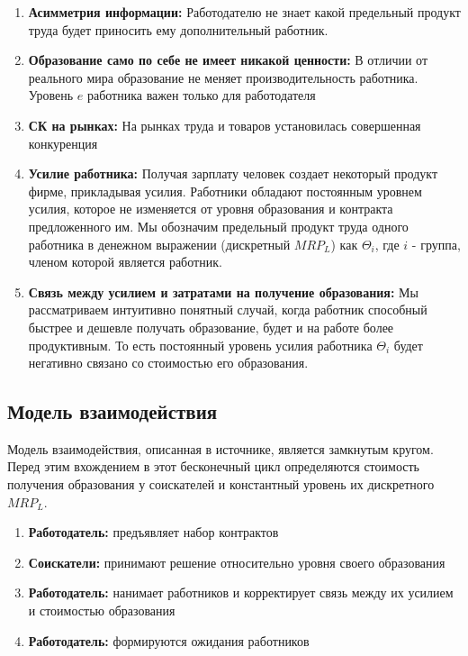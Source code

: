 \begin{enumerate}
    \item \textbf{Асимметрия информации:} Работодателю не знает какой предельный продукт труда будет приносить ему
    дополнительный работник.
    \item \textbf{Образование само по себе не имеет никакой ценности:} В отличии от реального мира образование не
    меняет производительность работника. Уровень $e$ работника важен только для работодателя
    \item \textbf{СК на рынках:} На рынках труда и товаров установилась совершенная конкуренция
    \item \textbf{Усилие работника:} Получая зарплату человек создает некоторый продукт фирме, прикладывая усилия.
    Работники обладают постоянным уровнем усилия, которое не изменяется от уровня образования и контракта
    предложенного им. Мы обозначим предельный продукт труда одного работника в денежном выражении (дискретный $MRP_L$)
    как $\Theta_i$, где $i$ - группа, членом которой является работник.
    \item \textbf{Связь между усилием и затратами на получение образования:} Мы рассматриваем интуитивно понятный
    случай, когда работник способный быстрее и дешевле получать образование, будет и на работе более продуктивным. То
    есть постоянный уровень усилия работника $\Theta_i$ будет негативно связано со стоимостью его образования.
\end{enumerate}

\subsection{Модель взаимодействия}

\indent\setlength{\parindent}{1em}Модель взаимодействия, описанная в источнике, является замкнутым кругом. Перед этим
вхождением в этот бесконечный цикл определяются стоимость получения образования у соискателей и константный уровень их
дискретного $MRP_L$.

\begin{enumerate}
    \item \textbf{Работодатель:} предъявляет набор контрактов
    \item \textbf{Соискатели:} принимают решение относительно уровня своего образования
    \item \textbf{Работодатель:} нанимает работников и корректирует связь между их усилием и стоимостью образования
    \item \textbf{Работодатель:} формируются ожидания работников
\end{enumerate}

